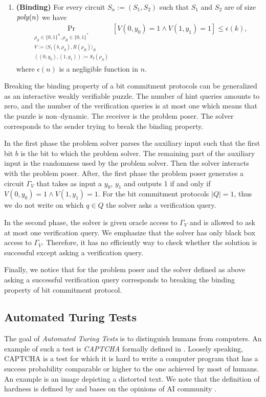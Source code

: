 \begin{definition}
\begin{enumerate}[]
\item{\textnormal{\textbf{(Binding)}}}
  For every circuit $S_n := (S_1, S_2)$ such that $S_1$ and $S_2$ are of size $\operatorname{\mathit{poly}}(n)$ we have
  \begin{align*}
    \underset{\substack{
        \rho_S \in \{0,1\}^{n}, \rho_R \in \{0,1\}^{*} \\
        V := \langle S_1(b,\rho_S), R(\rho_R) \rangle_{R} \\ ((0, y_0), (1, y_1)) := S_2(\rho_S)}}{\Pr}[V(0,y_0) = 1 \land V(1,y_1) = 1] \leq \epsilon(k),
  \end{align*}
  where $\epsilon(n)$ is a negligible function in $n$.
\end{enumerate}
\end{definition}

Breaking the binding property of a bit commitment protocols can be generalized as an interactive weakly verifiable puzzle.
The number of hint queries amounts to zero, and the number of the verification queries is at most one
which means that the puzzle is non--dynamic.
The receiver is the problem poser. The solver corresponds to the sender trying to break the binding property.

In the first phase the problem solver parses the auxiliary input such that the first bit $b$ is the bit to which
the problem solver. The remaining part of the auxiliary input is the randomness used by the problem solver.
Then the solver interacts with the problem poser.
After, the first phase the problem poser generates a circuit $\Gamma_V$ that takes as input a $y_0$, $y_1$ and outputs
1 if and only if $V(0,y_0) = 1 \land V(1,y_1) = 1$.
For the bit commitment protocols $|Q| = 1$, thus we do not write on which $q \in Q$ the solver asks a verification query.

In the second phase, the solver is given oracle access to $\Gamma_V$ and is allowed to ask at most one verification query.
We emphasize that the solver has only black box access to $\Gamma_V$. Therefore, it has no efficiently way to check whether
the solution is successful except asking a verification query.

Finally, we notice that for the problem poser and the solver defined as above asking a successful verification query
corresponds to breaking the binding property of bit commitment protocol.

\subsection{Automated Turing Tests}
The goal of \textit{Automated Turing Tests} is to distinguish humans from computers.
An example of such a test is \textit{CAPTCHA} formally defined in \cite{von2003captcha}.
Loosely speaking, CAPTCHA is a test for which it is hard to write a computer program that has a success
probability comparable or higher to the one achieved by most of humans.
An example is an image depicting a distorted text.
We note that the definition of hardness is defined by and bases on the opinions of AI community \cite{von2003captcha}.

